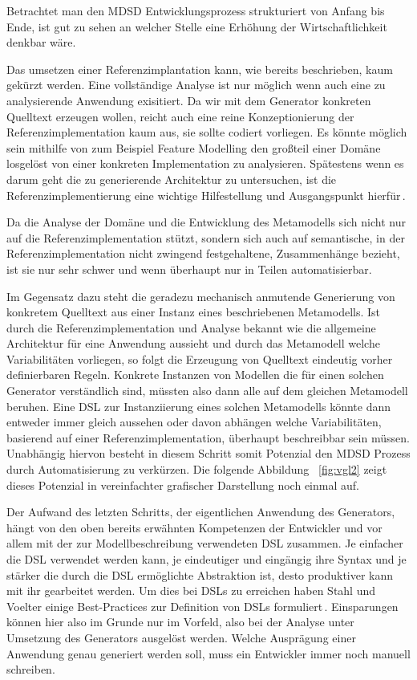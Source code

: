 \documentclass[12pt,oneside,a4paper,parskip]{scrbook}
\begin{document}
Betrachtet man den MDSD Entwicklungsprozess strukturiert von Anfang bis Ende, ist gut zu sehen an welcher Stelle eine Erhöhung der Wirtschaftlichkeit denkbar wäre. 

Das umsetzen einer Referenzimplantation kann, wie bereits beschrieben, kaum gekürzt werden. Eine vollständige Analyse ist nur möglich wenn auch eine zu analysierende Anwendung exisitiert. Da wir mit dem Generator konkreten Quelltext erzeugen wollen, reicht auch eine reine Konzeptionierung der Referenzimplementation kaum aus, sie sollte codiert vorliegen. Es könnte möglich sein mithilfe von zum Beispiel Feature Modelling den großteil einer Domäne losgelöst von einer konkreten Implementation zu analysieren. Spätestens wenn es darum geht die zu generierende Architektur zu untersuchen, ist die Referenzimplementierung eine wichtige Hilfestellung und Ausgangspunkt hierfür\,\cite[S. 123f.]{stahl2007}.

Da die Analyse der Domäne und die Entwicklung des Metamodells sich nicht nur auf die Referenzimplementation stützt, sondern sich auch auf semantische, in der Referenzimplementation nicht zwingend festgehaltene, Zusammenhänge bezieht, ist sie nur sehr schwer und wenn überhaupt nur in Teilen automatisierbar. 

Im Gegensatz dazu steht die geradezu mechanisch anmutende Generierung von konkretem Quelltext aus einer Instanz eines beschriebenen Metamodells. Ist durch die Referenzimplementation und Analyse bekannt wie die allgemeine Architektur für eine Anwendung aussieht und durch das Metamodell welche Variabilitäten vorliegen, so folgt die Erzeugung von Quelltext eindeutig vorher definierbaren Regeln. Konkrete Instanzen von Modellen die für einen solchen Generator verständlich sind, müssten also dann alle auf dem gleichen Metamodell beruhen. Eine DSL zur Instanziierung eines solchen Metamodells könnte dann entweder immer gleich aussehen oder davon abhängen welche Variabilitäten, basierend auf einer Referenzimplementation, überhaupt beschreibbar sein müssen. Unabhängig hiervon besteht in diesem Schritt somit Potenzial den MDSD Prozess durch Automatisierung zu verkürzen. Die folgende Abbildung ~\ref{fig:vgl2} zeigt dieses Potenzial in vereinfachter grafischer Darstellung noch einmal auf.

Der Aufwand des letzten Schritts, der eigentlichen Anwendung des Generators, hängt von den oben bereits erwähnten Kompetenzen der Entwickler und vor allem mit der zur Modellbeschreibung verwendeten DSL zusammen. Je einfacher die DSL verwendet werden kann, je eindeutiger und eingängig ihre Syntax und je stärker die durch die DSL ermöglichte Abstraktion ist, desto produktiver kann mit ihr gearbeitet werden. Um dies bei DSLs zu erreichen haben Stahl und Voelter einige Best-Practices zur Definition von DSLs formuliert\,\cite[S. 113]{stahl2007}. Einsparungen können hier also im Grunde nur im Vorfeld, also bei der Analyse unter Umsetzung des Generators ausgelöst werden. Welche Ausprägung einer Anwendung genau generiert werden soll, muss ein Entwickler immer noch manuell schreiben.
\end{document}
